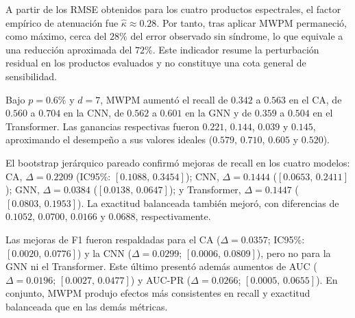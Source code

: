 \documentclass[fleqn,10pt]{wlscirep}
\begin{document}
A partir de los RMSE obtenidos para los cuatro productos espectrales,
el factor empírico de atenuación fue
$\widehat{\kappa}\approx0.28$. Por tanto, tras aplicar MWPM permaneció,
como máximo, cerca del $28\%$ del error observado sin síndrome, lo que
equivale a una reducción aproximada del $72\%$. Este indicador resume
la perturbación residual en los productos evaluados y no constituye
una cota general de sensibilidad.

Bajo $p=0.6\%$ y $d=7$, MWPM aumentó el recall de $0.342$ a $0.563$ en el CA, de $0.560$ a $0.704$ en la CNN, de $0.562$ a $0.601$ en la GNN y de $0.359$ a $0.504$ en el Transformer. Las ganancias respectivas fueron $0.221$, $0.144$, $0.039$ y $0.145$, aproximando el desempeño a sus valores ideales ($0.579$, $0.710$, $0.605$ y $0.520$).

El bootstrap jerárquico pareado confirmó mejoras de recall en los
cuatro modelos: CA, $\Delta=0.2209$ (IC95\%:
$[0.1088,\,0.3454]$); CNN, $\Delta=0.1444$
($[0.0653,\,0.2411]$); GNN, $\Delta=0.0384$
($[0.0138,\,0.0647]$); y Transformer, $\Delta=0.1447$
($[0.0803,\,0.1953]$). La exactitud balanceada también mejoró, con
diferencias de $0.1052$, $0.0700$, $0.0166$ y $0.0688$,
respectivamente.

Las mejoras de F1 fueron respaldadas para el CA ($\Delta=0.0357$; IC95\%: $[0.0020,\,0.0776]$) y la CNN ($\Delta=0.0299$; $[0.0006,\,0.0809]$), pero no para la GNN ni el Transformer. Este último presentó además aumentos de AUC ($\Delta=0.0196$; $[0.0027,\,0.0477]$) y AUC-PR ($\Delta=0.0266$; $[0.0005,\,0.0655]$). En conjunto, MWPM produjo efectos más consistentes en recall y exactitud balanceada que en las demás métricas.
\end{document}
